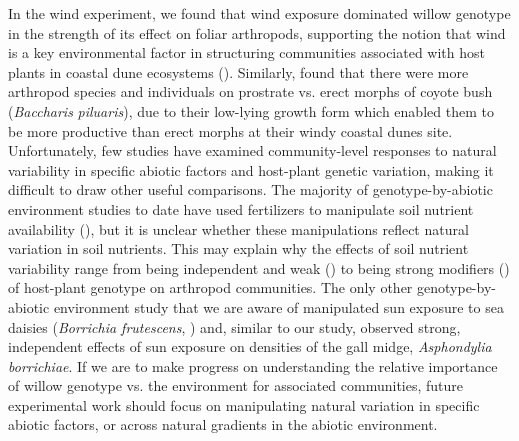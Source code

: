 \documentclass[11pt]{article}
\begin{document}
In the wind experiment, we found that wind exposure dominated willow genotype in the strength of its effect on foliar arthropods, supporting the notion that wind is a key environmental factor in structuring communities associated with host plants in coastal dune ecosystems (\citealt{Miller_1999, Crutsinger_2010, Crutsinger_2014}). Similarly, \cite{Crutsinger_2014} found that there were more arthropod species and individuals on prostrate vs. erect morphs of coyote bush (\emph{Baccharis} \emph{piluaris}), due to their low-lying growth form which enabled them to be more productive than erect morphs at their windy coastal dunes site. Unfortunately, few studies have examined community-level responses to natural variability in specific abiotic factors and host-plant genetic variation, making it difficult to draw other useful comparisons. The majority of genotype-by-abiotic environment studies to date have used fertilizers to manipulate soil nutrient availability (\citealt{Abdala_Roberts_2012, Orians_1996, Rossi_1998, Barrios2016}), but it is unclear whether these manipulations reflect natural variation in soil nutrients. This may explain why the effects of soil nutrient variability range from being independent and weak (\citealt{Abdala_Roberts_2012, Barrios2016}) to being strong modifiers (\citealt{Orians_1996}) of host-plant genotype on arthropod communities. The only other genotype-by-abiotic environment study that we are aware of manipulated sun exposure to sea daisies (\textit{Borrichia frutescens}, \citealt{Rossi_1998}) and, similar to our study, observed strong, independent effects of sun exposure on densities of the gall midge, \textit{Asphondylia borrichiae}. If we are to make progress on understanding the relative importance of willow genotype vs. the environment for associated communities, future experimental work should focus on manipulating natural variation in specific abiotic factors, or across natural gradients in the abiotic environment. 

\end{document}
